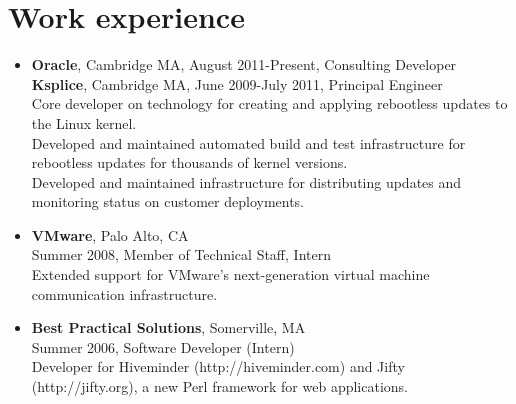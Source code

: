 \documentclass[letterpaper,10pt]{article}
\begin{document}
\section*{Work experience}
\vspace*{-0.2cm}
\begin{itemize}
\item\textbf{Oracle}, Cambridge MA, August 2011-Present, Consulting Developer \\
  \textbf{Ksplice}, Cambridge MA, June 2009-July 2011, Principal Engineer \\
  Core developer on technology for creating and applying rebootless
  updates to the Linux kernel. \\
  Developed and maintained automated build and test infrastructure for
  rebootless updates for thousands of kernel versions. \\
  Developed and maintained infrastructure for distributing updates and
  monitoring status on customer deployments.
  \item\textbf{VMware}, Palo Alto, CA \\
    Summer 2008, Member of Technical Staff, Intern \\
    Extended support for VMware's next-generation virtual machine
    communication infrastructure.
  \item \textbf{Best Practical Solutions}, Somerville, MA \\
    Summer 2006, Software Developer (Intern) \\
    Developer for Hiveminder (http://hiveminder.com) and Jifty
    (http://jifty.org), a new Perl framework for web applications.
          

\end{itemize}
\end{document}
